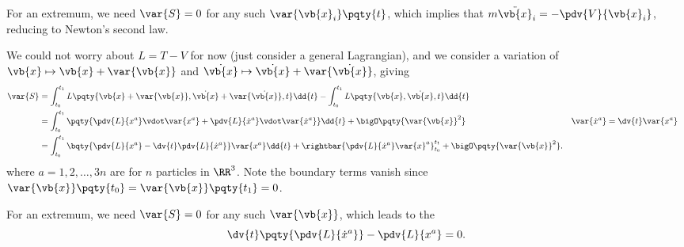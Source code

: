 For an extremum, we need \(\var{S} = 0\) for any such \(\var{\vb{x}_i}\pqty{t}\), which implies that \(m \ddot{\vb{x}}_i = - \pdv{V}{\vb{x}_i}\), reducing to Newton's second law.

We could not worry about \(L = T - V\) for now (just consider a general Lagrangian), and we consider a variation of \(\vb{x} \mapsto \vb{x} + \var{\vb{x}}\) and \(\dot{\vb{x}} \mapsto \dot{\vb{x}} + \var{\dot{\vb{x}}}\), giving
\begin{subequations}
    \begin{align}
        \var{S} &= \int_{t_0}^{t_1} L \pqty{\vb{x} + \var{\vb{x}}, \dot{\vb{x}} + \var{\dot{\vb{x}}}, t} \dd{t} - \int_{t_0}^{t_1} L \pqty{\vb{x}, \dot{\vb{x}}, t} \dd{t} \\
        &= \int_{t_0}^{t_1} \pqty{\pdv{L}{x^a} \vdot \var{x^a} + \pdv{L}{\dot{x}^a} \vdot \var{\dot{x}^a}} \dd{t} + \bigO\pqty{\var{\vb{x}}^2} &&  \var{\dot{x}^a} = \dv{t} \var{x^a} \\
        &= \int_{t_0}^{t_1} \bqty{\pdv{L}{x^a} - \dv{t} \pdv{L}{\dot{x}^a}} \var{x^a} \dd{t} + \rightbar{\pdv{L}{\dot{x}^a} \var{x}^a}_{t_0}^{t_1} + \bigO\pqty{\var{\vb{x}}^2}.
    \end{align}
\end{subequations}
where \(a = 1, 2, \ldots, 3n\) are for \(n\) particles in \(\RR^3\). Note the boundary terms vanish since \(\var{\vb{x}}\pqty{t_0} = \var{\vb{x}}\pqty{t_1} = 0\).

For an extremum, we need \(\var{S} = 0\) for any such \(\var{\vb{x}}\), which leads to the 
\begin{equation}
    \dv{t} \pqty{\pdv{L}{\dot{x}^a}} - \pdv{L}{x^a} = 0.
\end{equation}

